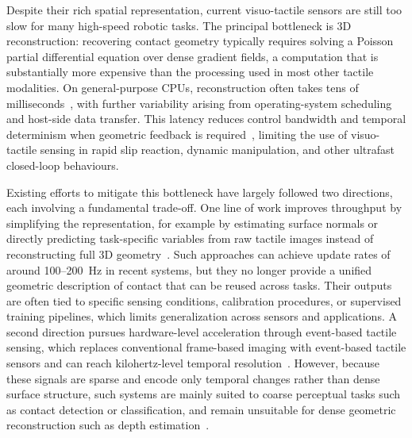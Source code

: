 \documentclass[10pt,a4paper]{article}
\begin{document}
Despite their rich spatial representation, current visuo-tactile sensors are still too slow for many high-speed robotic tasks. The principal bottleneck is 3D reconstruction: recovering contact geometry typically requires solving a Poisson partial differential equation over dense gradient fields, a computation that is substantially more expensive than the processing used in most other tactile modalities. On general-purpose CPUs, reconstruction often takes tens of milliseconds~\cite{yuan2017gelsight}, with further variability arising from operating-system scheduling and host-side data transfer. This latency reduces control bandwidth and temporal determinism when geometric feedback is required~\cite{lee2025highbandwidth}, limiting the use of visuo-tactile sensing in rapid slip reaction, dynamic manipulation, and other ultrafast closed-loop behaviours.

Existing efforts to mitigate this bottleneck have largely followed two directions, each involving a fundamental trade-off. One line of work improves throughput by simplifying the representation, for example by estimating surface normals or directly predicting task-specific variables from raw tactile images instead of reconstructing full 3D geometry~\cite{li2024signalprocessing,kota2026_3dcal}. Such approaches can achieve update rates of around 100--200~Hz in recent systems, but they no longer provide a unified geometric description of contact that can be reused across tasks. Their outputs are often tied to specific sensing conditions, calibration procedures, or supervised training pipelines, which limits generalization across sensors and applications. A second direction pursues hardware-level acceleration through event-based tactile sensing, which replaces conventional frame-based imaging with event-based tactile sensors and can reach kilohertz-level temporal resolution~\cite{funk2024evetac,jiang2026spikingtac}. However, because these signals are sparse and encode only temporal changes rather than dense surface structure, such systems are mainly suited to coarse perceptual tasks such as contact detection or classification, and remain unsuitable for dense geometric reconstruction such as depth estimation~\cite{funk2024evetac}.



\end{document}
